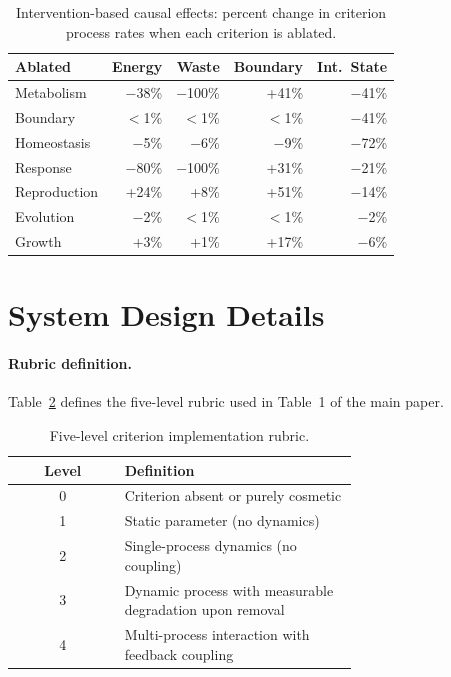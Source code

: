 \documentclass[letterpaper]{article}
\begin{document}
\begin{table}[htbp]
\centering
\caption{Intervention-based causal effects: percent change in criterion process
rates when each criterion is ablated.}
\label{tab:intervention}
\footnotesize
\begin{tabular}{@{}lrrrr@{}}
\toprule
Ablated & Energy & Waste & Boundary & Int.\ State \\
\midrule
Metabolism & $-$38\% & $-$100\% & +41\% & $-$41\% \\
Boundary & $<$1\% & $<$1\% & $<$1\% & $-$41\% \\
Homeostasis & $-$5\% & $-$6\% & $-$9\% & $-$72\% \\
Response & $-$80\% & $-$100\% & +31\% & $-$21\% \\
Reproduction & +24\% & +8\% & +51\% & $-$14\% \\
Evolution & $-$2\% & $<$1\% & $<$1\% & $-$2\% \\
Growth & +3\% & +1\% & +17\% & $-$6\% \\
\bottomrule
\end{tabular}
\end{table}

\section{System Design Details}

\paragraph{Rubric definition.}
Table~\ref{tab:rubric} defines the five-level rubric used in
Table~1 of the main paper.

\begin{table}[htbp]
\centering
\caption{Five-level criterion implementation rubric.}
\label{tab:rubric}
\footnotesize
\begin{tabular}{@{}cp{0.68\linewidth}@{}}
\toprule
Level & Definition \\
\midrule
0 & Criterion absent or purely cosmetic \\
1 & Static parameter (no dynamics) \\
2 & Single-process dynamics (no coupling) \\
3 & Dynamic process with measurable degradation upon removal \\
4 & Multi-process interaction with feedback coupling \\
\bottomrule
\end{tabular}
\end{table}
\end{document}
